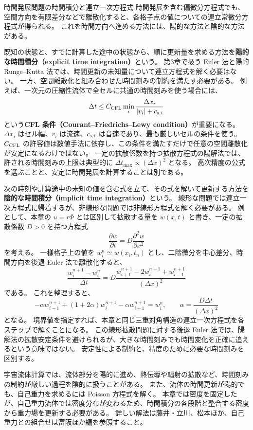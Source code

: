 \begin{topicblock}{時間発展問題の時間積分と連立一次方程式}
時間発展を含む偏微分方程式でも、空間方向を有限差分などで離散化すると、各格子点の値についての連立常微分方程式が得られる。
これを時間方向へ進める方法には、陽的な方法と陰的な方法がある。

既知の状態と、すでに計算した途中の状態から、順に更新量を求める方法を\textbf{陽的な時間積分（explicit time integration）}という。
第3章で扱う Euler 法と陽的 Runge--Kutta 法では、時間更新の未知量について連立方程式を解く必要はない。
一方、空間離散化と組み合わせた時間刻みの制約を満たす必要がある。
例えば、一次元の圧縮性流体で全セルに共通の時間刻みを使う場合には、
\[
 \Delta t\le C_{\rm CFL}\min_i\frac{\Delta x_i}{|v_i|+c_{{\rm s},i}}
\]
という\textbf{CFL 条件（Courant--Friedrichs--Lewy condition）}が重要になる。
$\Delta x_i$ はセル幅、$v_i$ は流速、$c_{{\rm s},i}$ は音速であり、最も厳しいセルの条件を使う。
$C_{\rm CFL}$ の許容値は数値手法に依存し、この条件を満たすだけで任意の空間離散化が安定になるわけではない。
一定の拡散係数を持つ拡散方程式の陽解法では、許される時間刻みの上限は典型的に $\Delta t_{\max}\propto(\Delta x)^2$ となる。
高次精度の公式を選ぶことと、安定に時間発展を計算することは別である。

次の時刻や計算途中の未知の値を含む式を立て、その式を解いて更新する方法を\textbf{陰的な時間積分（implicit time integration）}という。
線形な問題では連立一次方程式に帰着するが、非線形な問題では非線形方程式を解く必要がある。
例として、本章の $u=r\Phi$ とは区別して拡散する量を $w(x,t)$ と書き、一定の拡散係数 $D>0$ を持つ方程式
\[
 \frac{\partial w}{\partial t}=D\frac{\partial^2 w}{\partial x^2}
\]
を考える。
一様格子上の値を $w_i^n\simeq w(x_i,t_n)$ とし、二階微分を中心差分、時間方向を後退 Euler 法で離散化すると、
\[
 \frac{w_i^{n+1}-w_i^n}{\Delta t}
 =D\frac{w_{i+1}^{n+1}-2w_i^{n+1}+w_{i-1}^{n+1}}{(\Delta x)^2}
\]
である。
これを整理すると、
\[
 -\alpha w_{i-1}^{n+1}+(1+2\alpha)w_i^{n+1}-\alpha w_{i+1}^{n+1}=w_i^n,
 \qquad \alpha=\frac{D\Delta t}{(\Delta x)^2}
\]
となる。
境界値を指定すれば、本章と同じ三重対角構造の連立一次方程式を各ステップで解くことになる。
この線形拡散問題に対する後退 Euler 法では、陽解法の拡散安定条件を避けられるが、大きな時間刻みでも時間変化を正確に追えるという意味ではない。
安定性による制約と、精度のために必要な時間刻みを区別する。

宇宙流体計算では、流体部分を陽的に進め、熱伝導や輻射の拡散など、時間刻みの制約が厳しい過程を陰的に扱うことがある。
また、流体の時間更新が陽的でも、自己重力を求めるには Poisson 方程式を解く。
本章では密度を固定したが、自己重力流体では密度分布が変わるため、時間積分の各段階と整合する密度から重力場を更新する必要がある。
詳しい解法は藤井・立川\cite{fujii2020}、松本ほか\cite{matsumoto}、自己重力との組合せは富阪ほか編\cite{tomisaka2007}を参照すること。
\end{topicblock}

